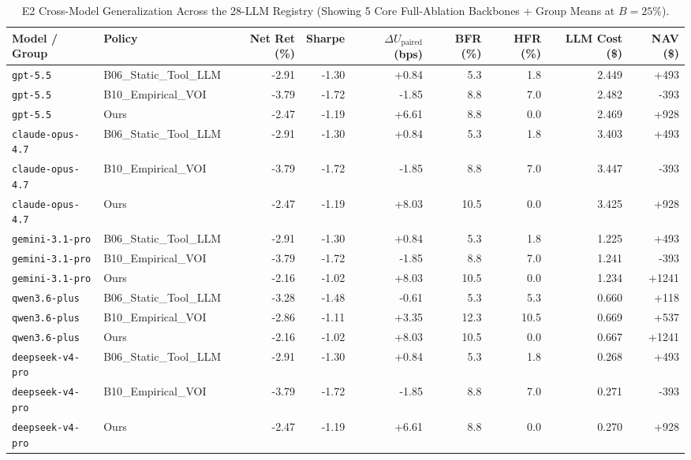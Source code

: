 \begin{table}[t]
\centering
\caption{E2 Cross-Model Generalization Across the 28-LLM Registry (Showing 5 Core Full-Ablation Backbones + Group Means at $B = 25\%$).}
\label{tab:e2_cross_model}
\footnotesize
\begin{tabular}{llrrrrrrr}
\toprule
Model / Group & Policy & Net Ret (\%) & Sharpe & $\Delta U_{\text{paired}}$ (bps) & BFR (\%) & HFR (\%) & LLM Cost (\$) & NAV (\$) \\
\midrule
\texttt{gpt-5.5} & B06\_Static\_Tool\_LLM & -2.91 & -1.30 & +0.84 & 5.3 & 1.8 & 2.449 & +493 \\
\texttt{gpt-5.5} & B10\_Empirical\_VOI & -3.79 & -1.72 & -1.85 & 8.8 & 7.0 & 2.482 & -393 \\
\texttt{gpt-5.5} & Ours & -2.47 & -1.19 & +6.61 & 8.8 & 0.0 & 2.469 & +928 \\
\texttt{claude-opus-4.7} & B06\_Static\_Tool\_LLM & -2.91 & -1.30 & +0.84 & 5.3 & 1.8 & 3.403 & +493 \\
\texttt{claude-opus-4.7} & B10\_Empirical\_VOI & -3.79 & -1.72 & -1.85 & 8.8 & 7.0 & 3.447 & -393 \\
\texttt{claude-opus-4.7} & Ours & -2.47 & -1.19 & +8.03 & 10.5 & 0.0 & 3.425 & +928 \\
\texttt{gemini-3.1-pro} & B06\_Static\_Tool\_LLM & -2.91 & -1.30 & +0.84 & 5.3 & 1.8 & 1.225 & +493 \\
\texttt{gemini-3.1-pro} & B10\_Empirical\_VOI & -3.79 & -1.72 & -1.85 & 8.8 & 7.0 & 1.241 & -393 \\
\texttt{gemini-3.1-pro} & Ours & -2.16 & -1.02 & +8.03 & 10.5 & 0.0 & 1.234 & +1241 \\
\texttt{qwen3.6-plus} & B06\_Static\_Tool\_LLM & -3.28 & -1.48 & -0.61 & 5.3 & 5.3 & 0.660 & +118 \\
\texttt{qwen3.6-plus} & B10\_Empirical\_VOI & -2.86 & -1.11 & +3.35 & 12.3 & 10.5 & 0.669 & +537 \\
\texttt{qwen3.6-plus} & Ours & -2.16 & -1.02 & +8.03 & 10.5 & 0.0 & 0.667 & +1241 \\
\texttt{deepseek-v4-pro} & B06\_Static\_Tool\_LLM & -2.91 & -1.30 & +0.84 & 5.3 & 1.8 & 0.268 & +493 \\
\texttt{deepseek-v4-pro} & B10\_Empirical\_VOI & -3.79 & -1.72 & -1.85 & 8.8 & 7.0 & 0.271 & -393 \\
\texttt{deepseek-v4-pro} & Ours & -2.47 & -1.19 & +6.61 & 8.8 & 0.0 & 0.270 & +928 \\
\bottomrule
\end{tabular}
\end{table}
